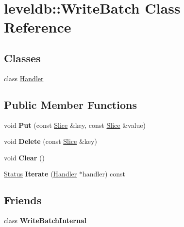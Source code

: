 \hypertarget{classleveldb_1_1_write_batch}{}\section{leveldb\+::Write\+Batch Class Reference}
\label{classleveldb_1_1_write_batch}
\subsection*{Classes}
\begin{DoxyCompactItemize}
\item 
class \mbox{\hyperlink{classleveldb_1_1_write_batch_1_1_handler}{Handler}}
\end{DoxyCompactItemize}
\subsection*{Public Member Functions}
\begin{DoxyCompactItemize}
\item 
\mbox{\label{classleveldb_1_1_write_batch_a30770379143a7ccb4ede18ddf0e45bf3}} 
void {\bfseries Put} (const \mbox{\hyperlink{classleveldb_1_1_slice}{Slice}} \&key, const \mbox{\hyperlink{classleveldb_1_1_slice}{Slice}} \&value)
\item 
\mbox{\label{classleveldb_1_1_write_batch_a473da7f94483dab253cc36b7b231ce53}} 
void {\bfseries Delete} (const \mbox{\hyperlink{classleveldb_1_1_slice}{Slice}} \&key)
\item 
\mbox{\label{classleveldb_1_1_write_batch_afd5058344dc9be113919a5110129006f}} 
void {\bfseries Clear} ()
\item 
\mbox{\label{classleveldb_1_1_write_batch_a64278020155c37619bfe007840bb2d23}} 
\mbox{\hyperlink{classleveldb_1_1_status}{Status}} {\bfseries Iterate} (\mbox{\hyperlink{classleveldb_1_1_write_batch_1_1_handler}{Handler}} $\ast$handler) const
\end{DoxyCompactItemize}
\subsection*{Friends}
\begin{DoxyCompactItemize}
\item 
\mbox{\label{classleveldb_1_1_write_batch_a0c491f15816190f8235ccd1367d5ae5f}} 
class {\bfseries Write\+Batch\+Internal}
\end{DoxyCompactItemize}



